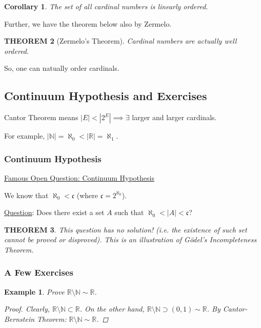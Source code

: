 \documentclass[12pt]{article}
\theoremstyle{blueplain}
\newtheorem{theorem}{THEOREM}[section]
\newtheorem{corollary}[theorem]{Corollary}
\theoremstyle{bluedef}
\theoremstyle{blueremark}
\newtheorem{example}{Example}[section]
\newcommand{\R}{\mathbb{R}}
\newcommand{\N}{\mathbb{N}}
\numberwithin{equation}{section}
\begin{document}
      \begin{corollary}
        The set of all cardinal numbers is linearly ordered.
      \end{corollary}

      Further, we have the theorem below also by Zermelo.

      \begin{theorem}[Zermelo's Theorem]
        Cardinal numbers are actually well ordered.
      \end{theorem}

      So, one can natually order cardinals.

      \clearpage

      \subsection{Continuum Hypothesis and Exercises}

      Cantor Theorem means $|E| < |2^E| \implies \exists$ larger and larger cardinals.

      For example, $|\N| = \aleph_0 < |\R| = \aleph_1$.

      \subsubsection{Continuum Hypothesis}

      \underline{Famous Open Question: Continuum Hypothesis}

      We know that $\aleph_0 < \mathfrak{c}$ (where $\mathfrak{c} = 2^{\aleph_0}$).

      \underline{Question}: Does there exist a set $A$ such that $\aleph_0 < |A| < \mathfrak{c}$?

      \begin{theorem}
        This question has no solution! (i.e. the existence of such set cannot be proved or disproved). This is an illustration of G\"odel's Incompleteness Theorem.
      \end{theorem}


      \subsubsection{A Few Exercises}

      \begin{example}
        Prove $\R \setminus \N \sim \R$.
        \begin{proof}
          Clearly, $\R \setminus \N \subset \R$.
          On the other hand, $\R \setminus \N \supset (0,1) \sim \R$.
          By Cantor-Bernstein Theorem: $\R \setminus \N \sim \R$.
        \end{proof}
      \end{example}
\end{document}
